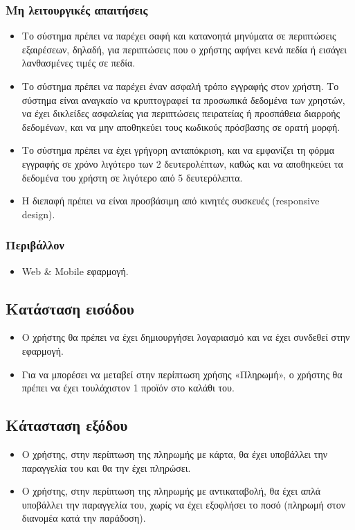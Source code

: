 \documentclass[12pt,a4paper,twoside]{book}
\begin{document}
\subsubsection{Μη λειτουργικές απαιτήσεις}
\begin{itemize}
  \item Το σύστημα πρέπει να παρέχει σαφή και κατανοητά μηνύματα σε περιπτώσεις εξαιρέσεων, δηλαδή, για περιπτώσεις που ο χρήστης αφήνει κενά πεδία ή εισάγει λανθασμένες τιμές σε πεδία.%
  \item Το σύστημα πρέπει να παρέχει έναν ασφαλή τρόπο εγγραφής στον χρήστη. Το σύστημα είναι αναγκαίο να κρυπτογραφεί τα προσωπικά δεδομένα των χρηστών, να έχει δικλείδες ασφαλείας για περιπτώσεις πειρατείας ή προσπάθεια διαρροής δεδομένων, και να μην αποθηκεύει τους κωδικούς πρόσβασης σε ορατή μορφή. %
  \item Το σύστημα πρέπει να έχει γρήγορη ανταπόκριση, και να εμφανίζει τη φόρμα εγγραφής σε χρόνο λιγότερο των 2 δευτερολέπτων, καθώς και να αποθηκεύει τα δεδομένα του χρήστη σε λιγότερο από 5 δευτερόλεπτα. %
  \item Η διεπαφή πρέπει να είναι προσβάσιμη από κινητές συσκευές (responsive design). %
\end{itemize}

\subsubsection{Περιβάλλον}
\begin{itemize}
  \item Web \& Mobile εφαρμογή.
\end{itemize}

\subsection{Κατάσταση εισόδου} %
\begin{itemize}
  \item Ο χρήστης θα πρέπει να έχει δημιουργήσει λογαριασμό και να έχει συνδεθεί στην εφαρμογή. %
  \item Για να μπορέσει να μεταβεί στην περίπτωση χρήσης «Πληρωμή», ο χρήστης θα πρέπει να έχει τουλάχιστον 1 προϊόν στο καλάθι του.
\end{itemize}

\subsection{Κάτασταση εξόδου} %
\begin{itemize}
  \item	Ο χρήστης, στην περίπτωση της πληρωμής με κάρτα, θα έχει υποβάλλει την παραγγελία του και θα την έχει πληρώσει. %
  \item Ο χρήστης, στην περίπτωση της πληρωμής με αντικαταβολή, θα έχει απλά υποβάλλει την παραγγελία του, χωρίς να έχει εξοφλήσει το ποσό (πληρωμή στον διανομέα κατά την παράδοση). %
\end{itemize}
\end{document}
